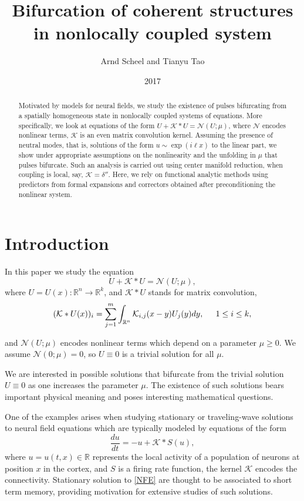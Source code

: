 \documentclass[letterpaper,11pt]{article}
\title{Bifurcation of coherent structures in nonlocally coupled system}
\author{Arnd Scheel and Tianyu Tao}
\date{2017}
\newcommand{\R}{\mathbb{R}}
\newcommand{\Nl}{\mathcal{N}}
\newcommand{\K}{\mathcal{K}}
\numberwithin{equation}{section}
\theoremstyle{plain}
\theoremstyle{remark}
\begin{document}
\maketitle
\begin{abstract}

Motivated by models for neural fields, we study the existence of pulses  bifurcating from a spatially homogeneous state in nonlocally coupled systems of equations. More specifically, we look at equations of the form $U + \K\ast U = \Nl(U;\mu)$, where $\Nl$ encodes nonlinear terms, $\K$ is an even matrix convolution kernel. Assuming the presence of neutral modes, that is, solutions of the form $u\sim \exp(i \ell x)$ to the linear part, we show under appropriate assumptions on the nonlinearity and the unfolding in $\mu$ that pulses bifurcate. Such an analysis is carried out using center manifold reduction, when coupling is local, say, $\K=\delta''$. Here, we rely on functional analytic methods using predictors from formal expansions and correctors obtained after preconditioning the nonlinear system.
\end{abstract}

\section{Introduction}
In this paper we study the equation
\begin{equation} \label{system}
U+\K\ast U = \Nl(U;\mu) ,
\end{equation}
where $U=U(x):\R^n \to \R^k$, and $\K\ast U$ stands for matrix convolution,
\[
(\K\ast U(x))_i = \sum_{j=1}^m \int_{\R^n} \K_{i,j}(x-y)U_j(y)dy, \hspace{0.2in} 1\le i\le k,
\]

and $\Nl(U;\mu)$ encodes nonlinear terms which depend on a parameter $\mu\ge 0$. We assume $\Nl(0;\mu) =0$, so $U\equiv 0$ is a trivial solution for all $\mu$.

We are interested in possible solutions that bifurcate from the trivial solution $U\equiv 0$ as one increases the parameter $\mu$. The existence of such solutions bears important physical meaning and poses interesting mathematical questions.

One of the examples arises when studying stationary or traveling-wave solutions to neural field equations which are typically modeled by equations of the form
\begin{equation}\label{NFE}
\frac{du}{dt} =- u+\K\ast S(u),
\end{equation}
where $u=u(t,x) \in \R$ represents the local activity of a population of neurons at position $x$ in the cortex, and $S$ is a firing rate function, the kernel $\K$ encodes the connectivity. Stationary solution to \eqref{NFE} are thought to be associated to short term memory, providing motivation for extensive studies of such solutions.
\end{document}
